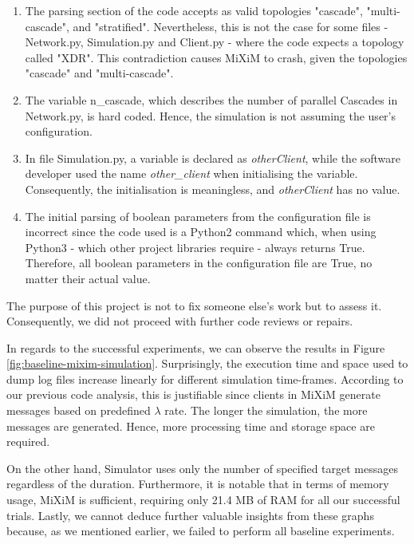 \documentclass[logo,msc,cyber]{infthesis}   %
\begin{document}
\begin{enumerate}
    \item The parsing section of the code accepts as valid topologies "cascade",
    "multi-cascade", and "stratified". Nevertheless, this is not the case for
    some files - Network.py, Simulation.py and Client.py - where the code
    expects a topology called "XDR". This contradiction causes MiXiM to crash,
    given the topologies "cascade" and "multi-cascade". 
    \item The variable n\_cascade, which describes the number of parallel
    Cascades in Network.py, is hard coded. Hence, the simulation is not assuming
    the user's configuration.
    \item In file Simulation.py, a variable is declared as \emph{otherClient}, while
    the software developer used the name \emph{other\_client} when initialising the
    variable. Consequently, the initialisation is meaningless, and \emph{otherClient}
    has no value.
    \item The initial parsing of boolean parameters from the configuration file
    is incorrect since the code used is a Python2 command which, when using
    Python3 - which other project libraries require - always returns True.
    Therefore, all boolean parameters in the configuration file are True, no
    matter their actual value.
\end{enumerate}

The purpose of this project is not to fix someone else's work but to assess
it. Consequently, we did not proceed with further code reviews or repairs.

In regards to the successful experiments, we can observe the results in Figure
\ref{fig:baseline-mixim-simulation}. Surprisingly, the execution time and space
used to dump log files increase linearly for different simulation time-frames.
According to our previous code analysis, this is justifiable since clients in
MiXiM generate messages based on predefined $\lambda$ rate. The longer the
simulation, the more messages are generated. Hence, more processing time and
storage space are required.

On the other hand, Simulator uses only the number of specified target messages
regardless of the duration. Furthermore, it is notable that in terms of memory
usage, MiXiM is sufficient, requiring only 21.4 MB of RAM for all our
successful trials. Lastly, we cannot deduce further valuable insights from these
graphs because, as we mentioned earlier, we failed to perform all baseline
experiments.
\end{document}
